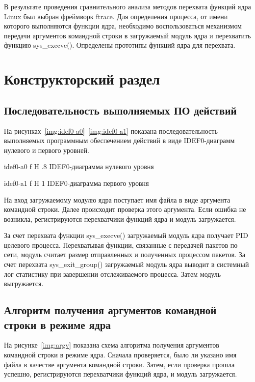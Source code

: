 \documentclass{bmstu}
\begin{document}
В результате проведения сравнительного анализа методов перехвата функций ядра Linux был выбран фреймворк ftrace. 
Для определения процесса, от имени которого выполняются функции ядра, необходимо воспользоваться механизмом передачи аргументов командной строки в загружаемый модуль ядра и перехватить функцию sys\_execve(). 
Определены прототипы функций ядра для перехвата.

\chapter{Конструкторский раздел}

\section{Последовательность выполняемых ПО действий}

На рисунках~\ref{img:idef0-a0}--\ref{img:idef0-a1} показана последовательность выполняемых программным обеспечением действий в виде IDEF0-диаграмм нулевого и первого уровней.

    {idef0-a0}
    {f}
    {H}
    {.8\textwidth}
    {IDEF0-диаграмма нулевого уровня}
    
    {idef0-a1}
    {f}
    {H}
    {1\textwidth}
    {IDEF0-диаграмма первого уровня}

На вход загружаемому модулю ядра поступает имя файла в виде аргумента командной строки. 
Далее происходит проверка этого аргумента. 
Если ошибка не возникла, регистрируются перехватчики функций ядра и модуль загружается.

За счет перехвата функции sys\_execve() загружаемый модуль ядра получает PID целевого процесса. 
Перехватывая функции, связанные с передачей пакетов по сети, модуль считает размер отправленных и полученных процессом пакетов. 
За счет перехвата sys\_exit\_group() загружаемый модуль ядра выводит в системный лог статистику при завершении отслеживаемого процесса. 
Затем модуль выгружается.

\section{Алгоритм получения аргументов командной строки в режиме ядра}

На рисунке~\ref{img:argv} показана схема алгоритма получения аргументов командной строки в режиме ядра. 
Сначала проверяется, было ли указано имя файла в качестве аргумента командной строки. 
Затем, если проверка прошла успешно, регистрируются перехватчики функций ядра, и модуль загружается.
\end{document}
